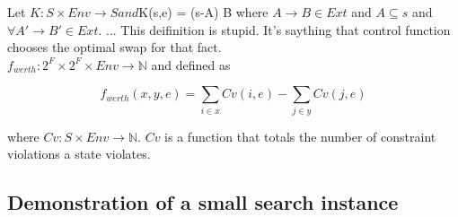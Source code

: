 \documentclass{article}
\begin{document}
Let $K: S \times Env \rightarrow S and $K(s,e) = (s-A) \cup B where $A
\rightarrow B \in Ext$ and $A \subseteq s$ and $\forall A' \rightarrow
B' \in Ext.$ ... This deifinition is stupid. It's saything that
control function chooses the optimal swap for that fact.\\

$f_{werth}: 2^F \times 2^F \times Env \rightarrow \mathbb{N}$ and
defined as

\[
f_{werth}(x, y, e) = \sum_{i \in x}Cv(i, e) - \sum_{j \in y}Cv(j, e)
\]

where $Cv: S \times Env \rightarrow \mathbb{N}$. $Cv$ is a function
that totals the number of constraint violations a state violates.


\subsection{Demonstration of a small search instance}
\end{document}
